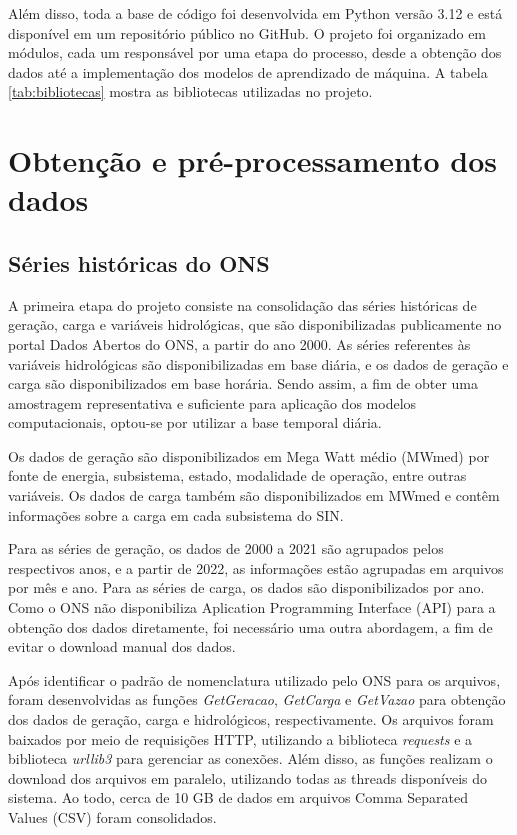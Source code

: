 Além disso, toda a base de código foi desenvolvida em Python versão 3.12 e está disponível em um repositório público no
GitHub. O projeto foi organizado em módulos, cada um responsável por uma etapa do processo, desde a obtenção dos dados 
até a implementação dos modelos de aprendizado de máquina. A tabela \ref{tab:bibliotecas} mostra as bibliotecas 
utilizadas no projeto.

\section{Obtenção e pré-processamento dos dados}
\subsection{Séries históricas do ONS}

A primeira etapa do projeto consiste na consolidação das séries históricas de geração, carga e variáveis hidrológicas,
que são disponibilizadas publicamente no portal Dados Abertos do ONS, a partir do ano 2000. As séries referentes 
às variáveis hidrológicas são disponibilizadas em base diária, e os dados de geração e carga são disponibilizados em 
base horária. Sendo assim, a fim de obter uma amostragem representativa e suficiente para aplicação dos modelos 
computacionais, optou-se por utilizar a base temporal diária. 

Os dados de geração são disponibilizados em Mega Watt médio (MWmed) por fonte de energia, subsistema, estado, 
modalidade de operação, entre outras variáveis. Os dados de carga também são disponibilizados em MWmed e contêm 
informações sobre a carga em cada subsistema do SIN.

Para as séries de geração, os dados de 2000 a 2021 são agrupados pelos respectivos anos, e a partir de 2022,
as informações estão agrupadas em arquivos por mês e ano. Para as séries de carga, os dados são disponibilizados por
ano. Como o ONS não disponibiliza Aplication Programming Interface (API) para a obtenção dos dados diretamente, foi 
necessário uma outra abordagem, a fim de evitar o download manual dos dados. 

Após identificar o padrão de nomenclatura utilizado pelo ONS para os arquivos, foram desenvolvidas as funções 
\textit{GetGeracao}, \textit{GetCarga} e \textit{GetVazao} para obtenção dos dados de geração, carga e hidrológicos,
respectivamente. Os arquivos foram baixados por meio de requisições HTTP, utilizando a biblioteca \textit{requests} e
a biblioteca \textit{urllib3} para gerenciar as conexões. Além disso, as funções realizam o download dos arquivos em
paralelo, utilizando todas as threads disponíveis do sistema. Ao todo, cerca de 10 GB de dados em arquivos Comma 
Separated Values (CSV) foram consolidados.


